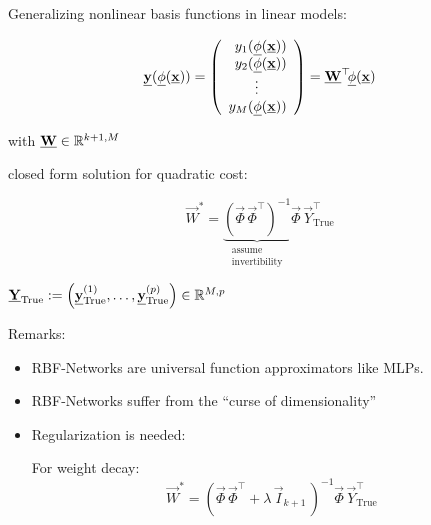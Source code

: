 \begin{frame}\frametitle{\subsecname}

Generalizing nonlinear basis functions in linear models:

\begin{equation}
\underline{\mathbf{y}}(\underline{\mathbf{\phi}}(\underline{\mathbf{x}})) = 
\left( \begin{array}{rrrrrrrrrrrrrrrrrrrrrrrrrr} 
y_1(\underline{\mathbf{\phi}}(\underline{\mathbf{x}}))\\
y_2(\underline{\mathbf{\phi}}(\underline{\mathbf{x}}))\\
\vdots\qquad\\
y_M(\underline{\mathbf{\phi}}(\underline{\mathbf{x}}))
\\ \end{array} \right)
= \underline{\mathbf{W}}^\top \kern-.5ex \underline{\mathbf{\phi}}(\underline{\mathbf{x}})
\end{equation}

\svspace{-3mm}

with $\underline{\mathbf{W}} \in \mathbb{R}^{k+1,M}$

closed form solution for quadratic cost: 

\begin{equation}
\vec W^{*} =
\underbrace{
\left(\vec \Phi \, \vec \Phi^{\top} \right)^{-1}
}_{
\substack{
\text{assume}\\ \text{invertibility}}
}
\vec \Phi \, \vec Y_{\text{True}}^{\top}
\end{equation}


\pause

\svspace{-3mm}

 $\underline{\mathbf{Y}}_{\text{True}} := \left( \underline{\mathbf{y}}_{\text{True}}^{(1)},\ldots,\underline{\mathbf{y}}_{\text{True}}^{(p)}\right) \in \mathbb{R}^{M,p}$

\end{frame}

\begin{frame}
Remarks:

\begin{itemize}
\item RBF-Networks are universal function approximators like MLPs.
\item RBF-Networks suffer from the ``curse of dimensionality''
\item Regularization is needed:

For weight decay:
\begin{equation}
\vec W^{*} = \left( \vec \Phi \, \vec \Phi^{\top} + \lambda\,\vec I_{k+1} \,\right)^{-1} \vec \Phi \, \vec Y_{\text{True}}^{\top}
\end{equation}

\end{itemize}

\end{frame}

